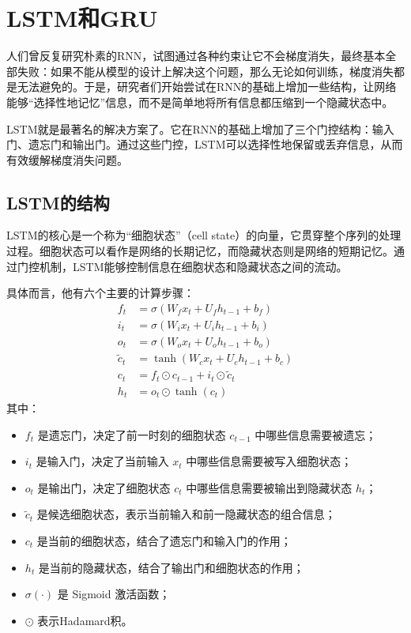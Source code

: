 \section{LSTM和GRU}

人们曾反复研究朴素的RNN，试图通过各种约束让它不会梯度消失，最终基本全部失败：如果不能从模型的设计上解决这个问题，那么无论如何训练，梯度消失都是无法避免的。于是，研究者们开始尝试在RNN的基础上增加一些结构，让网络能够“选择性地记忆”信息，而不是简单地将所有信息都压缩到一个隐藏状态中。

LSTM就是最著名的解决方案了。它在RNN的基础上增加了三个门控结构：输入门、遗忘门和输出门。通过这些门控，LSTM可以选择性地保留或丢弃信息，从而有效缓解梯度消失问题。

\subsection{LSTM的结构}

LSTM的核心是一个称为“细胞状态”（cell state）的向量，它贯穿整个序列的处理过程。细胞状态可以看作是网络的长期记忆，而隐藏状态则是网络的短期记忆。通过门控机制，LSTM能够控制信息在细胞状态和隐藏状态之间的流动。

具体而言，他有六个主要的计算步骤：
\begin{align}
    f_t &= \sigma(W_f x_t + U_f h_{t-1} + b_f) \label{eq:lstm_forget}\\
    i_t &= \sigma(W_i x_t + U_i h_{t-1} + b_i) \\
    o_t &= \sigma(W_o x_t + U_o h_{t-1} + b_o) \\
    \tilde{c}_t &= \tanh(W_c x_t + U_c h_{t-1} + b_c) \\
    c_t &= f_t \odot c_{t-1} + i_t \odot \tilde{c}_t \label{eq:lstm_cell}\\
    h_t &= o_t \odot \tanh(c_t) \label{eq:lstm_hidden}
\end{align}
其中：
\begin{itemize}
    \item $f_t$ 是遗忘门，决定了前一时刻的细胞状态 $c_{t-1}$ 中哪些信息需要被遗忘；
    \item $i_t$ 是输入门，决定了当前输入 $x_t$ 中哪些信息需要被写入细胞状态；
    \item $o_t$ 是输出门，决定了细胞状态 $c_t$ 中哪些信息需要被输出到隐藏状态 $h_t$；
    \item $\tilde{c}_t$ 是候选细胞状态，表示当前输入和前一隐藏状态的组合信息；
    \item $c_t$ 是当前的细胞状态，结合了遗忘门和输入门的作用；
    \item $h_t$ 是当前的隐藏状态，结合了输出门和细胞状态的作用；
    \item $\sigma(\cdot)$ 是 Sigmoid 激活函数；
    \item $\odot$ 表示Hadamard积。
\end{itemize}

